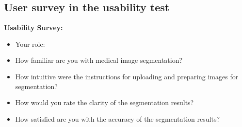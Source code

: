 \documentclass[12pt, titlepage]{article}
\begin{document}
\subsection{User survey in the usability test}
\label{7_2}
\textbf{Usability Survey:}
\begin{itemize}
    \item Your role: 
    \item How familiar are you with medical image segmentation?
    \item How intuitive were the instructions for uploading and preparing images for segmentation?
    \item How would you rate the clarity of the segmentation results?
    \item How satisfied are you with the accuracy of the segmentation results?
\end{itemize}
\end{document}
